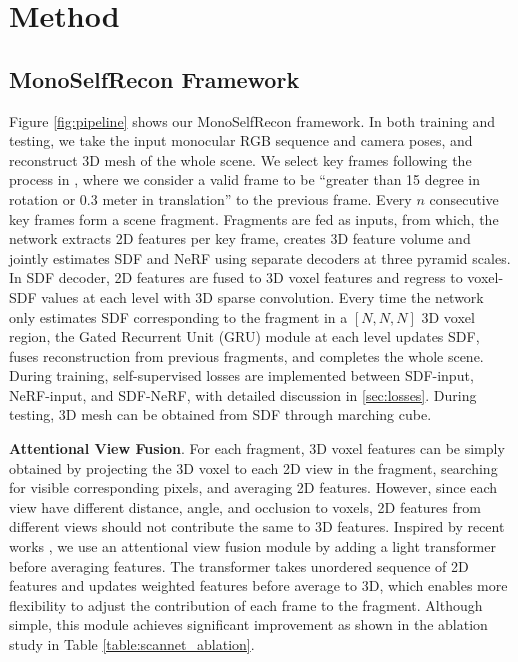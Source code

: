 \vspace{-2mm}
\section{Method}
\label{sec:method}
\vspace{-2mm}
\subsection{MonoSelfRecon Framework}
\quad Figure \ref{fig:pipeline} shows our MonoSelfRecon framework. In both training and testing, we take the input monocular RGB sequence and camera poses, and reconstruct 3D mesh of the whole scene. We select key frames following the process in \cite{key_select}, where we consider a valid frame to be ``greater than 15 degree in rotation or 0.3 meter in translation'' to the previous frame. Every $n$ consecutive key frames form a scene fragment. Fragments are fed as inputs, from which, the network extracts 2D features per key frame, creates 3D feature volume and jointly estimates SDF and NeRF using separate decoders at three pyramid scales. In SDF decoder, 2D features are fused to 3D voxel features and regress to voxel-SDF values at each level with 3D sparse convolution. Every time the network only estimates SDF corresponding to the fragment in a $[N,N,N]$ 3D voxel region, the Gated Recurrent Unit (GRU) module at each level updates SDF, fuses reconstruction from previous fragments, and completes the whole scene. During training, self-supervised losses are implemented between SDF-input, NeRF-input, and SDF-NeRF, with detailed discussion in \ref{sec:losses}. During testing, 3D mesh can be obtained from SDF through marching cube\cite{marchingcube}.  

\noindent
\textbf{Attentional View Fusion}.
For each fragment, 3D voxel features can be simply obtained by projecting the 3D voxel to each 2D view in the fragment, searching for visible corresponding pixels, and averaging 2D features. However, since each view have different distance, angle, and occlusion to voxels, 2D features from different views should not contribute the same to 3D features. Inspired by recent works \cite{vortx}, we use an attentional view fusion module by adding a light transformer before averaging features. The transformer takes unordered sequence of 2D features and updates weighted features before average to 3D, which enables more flexibility to adjust the contribution of each frame to the fragment. Although simple, this module achieves significant improvement as shown in the ablation study in Table \ref{table:scannet_ablation}.

